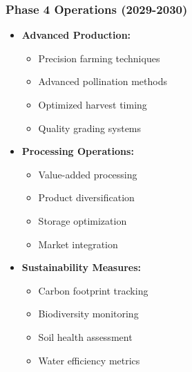 \subsubsection{Phase 4 Operations (2029-2030)}
\begin{itemize}
    \item \textbf{Advanced Production:}
    \begin{itemize}
        \item Precision farming techniques
        \item Advanced pollination methods
        \item Optimized harvest timing
        \item Quality grading systems
    \end{itemize}
    \item \textbf{Processing Operations:}
    \begin{itemize}
        \item Value-added processing
        \item Product diversification
        \item Storage optimization
        \item Market integration
    \end{itemize}
    \item \textbf{Sustainability Measures:}
    \begin{itemize}
        \item Carbon footprint tracking
        \item Biodiversity monitoring
        \item Soil health assessment
        \item Water efficiency metrics
    \end{itemize}
\end{itemize}

